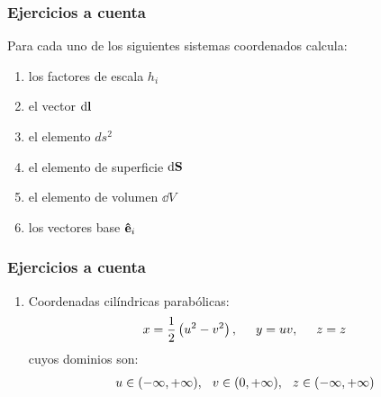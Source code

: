 \documentclass[12pt]{beamer}
\begin{document}
\begin{frame}
\frametitle{Ejercicios a cuenta}
Para  cada uno de los siguientes sistemas coordenados calcula:
\begin{enumerate}[<+->]
\item los factores de escala $h_{i}$
\item el vector $\dd{\vb{l}}$
\item el elemento $ds^{2}$
\item el elemento de superficie $\dd{\vb{S}}$
\item el elemento de volumen $\dd{V}$
\item los vectores base $\vu{e}_{i}$
\end{enumerate}
\end{frame}
\begin{frame}
\frametitle{Ejercicios a cuenta}
\begin{enumerate}[<+->]
\item  Coordenadas cilíndricas parabólicas:
\begin{align*}
x = \dfrac{1}{2} \left( u^{2} - v^{2} \right), \hspace{0.5cm} y = uv, \hspace{0.5cm} z = z
\end{align*}
cuyos dominios son:
\begin{align*}
u \in (-\infty, +\infty), \hspace{0.25cm} v \in (0, +\infty), \hspace{0.25cm} z \in (-\infty, +\infty)
\end{align*}
\seti
\end{enumerate}
\end{frame}
\end{document}
